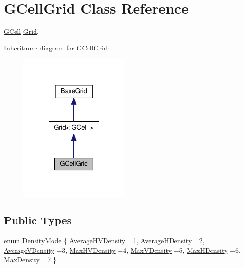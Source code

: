 \hypertarget{classKatabatic_1_1GCellGrid}{}\section{G\+Cell\+Grid Class Reference}
\label{classKatabatic_1_1GCellGrid}


\mbox{\hyperlink{classKatabatic_1_1GCell}{G\+Cell}} \mbox{\hyperlink{classKatabatic_1_1Grid}{Grid}}.  




Inheritance diagram for G\+Cell\+Grid\+:\nopagebreak
\begin{figure}[H]
\begin{center}
\leavevmode
\includegraphics[width=156pt]{classKatabatic_1_1GCellGrid__inherit__graph}
\end{center}
\end{figure}
\subsection*{Public Types}
\begin{DoxyCompactItemize}
\item 
enum \mbox{\hyperlink{classKatabatic_1_1GCellGrid_a07884f5e1af410e98208fed76a2b40fe}{Density\+Mode}} \{ \newline
\mbox{\hyperlink{classKatabatic_1_1GCellGrid_a07884f5e1af410e98208fed76a2b40fead15bf3e5b63f398d76d717a088acd310}{Average\+H\+V\+Density}} =1, 
\newline
\mbox{\hyperlink{classKatabatic_1_1GCellGrid_a07884f5e1af410e98208fed76a2b40feaec0ad06385eae8d1e2dee4f3c9f9f4ed}{Average\+H\+Density}} =2, 
\newline
\mbox{\hyperlink{classKatabatic_1_1GCellGrid_a07884f5e1af410e98208fed76a2b40fead1a1d89017d10aeb63d1c05b6fb650dd}{Average\+V\+Density}} =3, 
\newline
\mbox{\hyperlink{classKatabatic_1_1GCellGrid_a07884f5e1af410e98208fed76a2b40fea8265e053af0708a508ecbce86d1a8165}{Max\+H\+V\+Density}} =4, 
\newline
\mbox{\hyperlink{classKatabatic_1_1GCellGrid_a07884f5e1af410e98208fed76a2b40fea5f0a89ca367ef98550eaa86c1e32c873}{Max\+V\+Density}} =5, 
\newline
\mbox{\hyperlink{classKatabatic_1_1GCellGrid_a07884f5e1af410e98208fed76a2b40fea2a6d29b012cc89026c3c0061f87a4f03}{Max\+H\+Density}} =6, 
\newline
\mbox{\hyperlink{classKatabatic_1_1GCellGrid_a07884f5e1af410e98208fed76a2b40fea90a2f4a4ee8558de9f99458ddeab852c}{Max\+Density}} =7
 \}
\end{DoxyCompactItemize}
